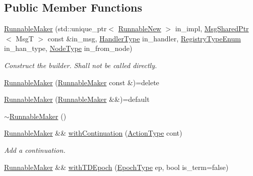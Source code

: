 \subsection*{Public Member Functions}
\begin{DoxyCompactItemize}
\item 
\hyperlink{structvt_1_1runnable_1_1_runnable_maker_a6c8b584a14ce68c2d5d516c68ba5d64b}{Runnable\+Maker} (std\+::unique\+\_\+ptr$<$ \hyperlink{structvt_1_1runnable_1_1_runnable_new}{Runnable\+New} $>$ in\+\_\+impl, \hyperlink{namespacevt_ab2b3d506ec8e8d1540aede826d84a239}{Msg\+Shared\+Ptr}$<$ MsgT $>$ const \&in\+\_\+msg, \hyperlink{namespacevt_af64846b57dfcaf104da3ef6967917573}{Handler\+Type} in\+\_\+handler, \hyperlink{namespacevt_1_1auto__registry_a9f369ca2b484130b396729e2ddf05241}{Registry\+Type\+Enum} in\+\_\+han\+\_\+type, \hyperlink{namespacevt_a866da9d0efc19c0a1ce79e9e492f47e2}{Node\+Type} in\+\_\+from\+\_\+node)
\begin{DoxyCompactList}\small\item\em Construct the builder. Shall not be called directly. \end{DoxyCompactList}\item 
\hyperlink{structvt_1_1runnable_1_1_runnable_maker_adf8ab1ce30a6577494f1c5dc4d454186}{Runnable\+Maker} (\hyperlink{structvt_1_1runnable_1_1_runnable_maker}{Runnable\+Maker} const \&)=delete
\item 
\hyperlink{structvt_1_1runnable_1_1_runnable_maker_abeee34efa8b7bc1586727bee5f71c6d4}{Runnable\+Maker} (\hyperlink{structvt_1_1runnable_1_1_runnable_maker}{Runnable\+Maker} \&\&)=default
\item 
\hyperlink{structvt_1_1runnable_1_1_runnable_maker_a0700d91c1114ae97ac74a4841ec2499c}{$\sim$\+Runnable\+Maker} ()
\item 
\hyperlink{structvt_1_1runnable_1_1_runnable_maker}{Runnable\+Maker} \&\& \hyperlink{structvt_1_1runnable_1_1_runnable_maker_aa547117a9c2e36d77f60712ec78eef58}{with\+Continuation} (\hyperlink{namespacevt_ae0a5a7b18cc99d7b732cb4d44f46b0f3}{Action\+Type} cont)
\begin{DoxyCompactList}\small\item\em Add a continuation. \end{DoxyCompactList}\item 
\hyperlink{structvt_1_1runnable_1_1_runnable_maker}{Runnable\+Maker} \&\& \hyperlink{structvt_1_1runnable_1_1_runnable_maker_a60b98132fcf31de89854ca70c087eb0e}{with\+T\+D\+Epoch} (\hyperlink{namespacevt_a81d11b28122d43bf9834577e4a06440f}{Epoch\+Type} ep, bool is\+\_\+term=false)

\end{DoxyCompactItemize}
